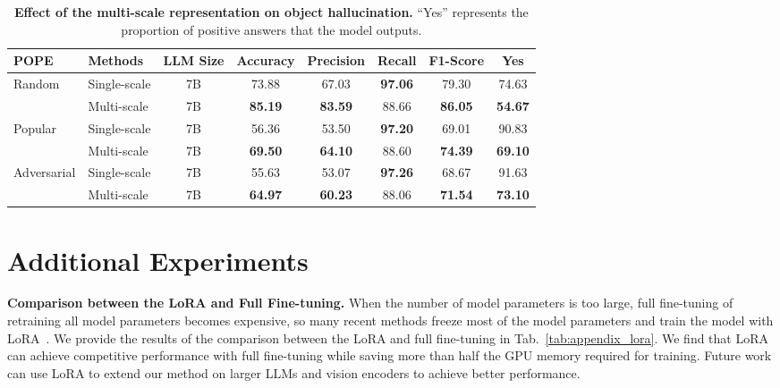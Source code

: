 \documentclass[10pt,twocolumn,letterpaper]{article}
\newcommand{\myparagraph}[1]{\textbf{#1}\hspace{1.8ex}}
\begin{document}
\begin{table*}[t]
\centering
{
\begin{tabular}{llcccccc}
\toprule[.9pt]
\textbf{POPE} &{\textbf{Methods}} & {\textbf{LLM Size}} & Accuracy & Precision & Recall & F1-Score & Yes \\ \midrule
 \multirow{2}{*}{{Random}} 
 & Single-scale & 7B & 73.88 & 67.03 & \bf{97.06} & 79.30 & 74.63 \\ 
 & \cellcolor{aliceblue!60} Multi-scale & \cellcolor{aliceblue!60} 7B & \cellcolor{aliceblue!60} \bf{85.19} & \cellcolor{aliceblue!60} \bf{83.59} & \cellcolor{aliceblue!60} 88.66 & \cellcolor{aliceblue!60} \bf{86.05} & \cellcolor{aliceblue!60} \bf{54.67}  \\ \midrule
  \multirow{2}{*}{{Popular}} 
 & Single-scale & 7B & 56.36 & 53.50 & \bf{97.20} & 69.01 & 90.83 \\ 
 & \cellcolor{aliceblue!60} Multi-scale & \cellcolor{aliceblue!60} 7B & \cellcolor{aliceblue!60} \bf{69.50} & \cellcolor{aliceblue!60} \bf{64.10} & \cellcolor{aliceblue!60} 88.60 & \cellcolor{aliceblue!60} \bf{74.39} & \cellcolor{aliceblue!60} \bf{69.10}  \\ \midrule
  \multirow{2}{*}{{Adversarial}} 
 & Single-scale & 7B & 55.63 & 53.07 & \bf{97.26} & 68.67 & 91.63 \\ 
 & \cellcolor{aliceblue!60} Multi-scale & \cellcolor{aliceblue!60} 7B & \cellcolor{aliceblue!60} \bf{64.97} & \cellcolor{aliceblue!60} \bf{60.23} & \cellcolor{aliceblue!60} 88.06 & \cellcolor{aliceblue!60} \bf{71.54} & \cellcolor{aliceblue!60} \bf{73.10}  \\ 
\bottomrule[.9pt]
\end{tabular}
\vspace{-.4em}
\caption{\textbf{Effect of the multi-scale representation on object hallucination.} ``Yes'' represents the proportion of positive answers that the model outputs.}
\label{tab:appendix_multi}
}
\end{table*}

\section{Additional Experiments}\label{appendix:Additional Experiments}
\noindent \myparagraph{Comparison between the LoRA and Full Fine-tuning.}
When the number of model parameters is too large, full fine-tuning of retraining all model parameters becomes expensive, so many recent methods freeze most of the model parameters and train the model with LoRA~\cite{hu2022lora}. We provide the results of the comparison between the LoRA and full fine-tuning in Tab.~\ref{tab:appendix_lora}. We find that LoRA can achieve competitive performance with full fine-tuning while saving more than half the GPU memory required for training. Future work can use LoRA to extend our method on larger LLMs and vision encoders to achieve better performance.
\end{document}
